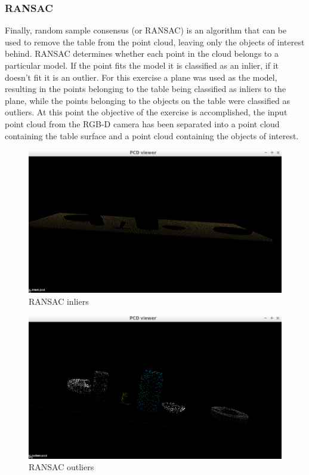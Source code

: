 \documentclass{article}
\begin{document}
\subsubsection{RANSAC}
Finally, random sample consensus (or RANSAC) is an algorithm that can be used to remove the table from the point cloud, leaving only the objects of interest behind. RANSAC determines whether each point in the cloud belongs to a particular model. If the point fits the model it is classified as an inlier, if it doesn't fit it is an outlier. For this exercise a plane was used as the model, resulting in the points belonging to the table being classified as inliers to the plane, while the points belonging to the objects on the table were classified as outliers. At this point the objective of the exercise is accomplished, the input point cloud from the RGB-D camera has been separated into a point cloud containing the table surface and a point cloud containing the objects of interest.

\begin{figure}[H]
    \includegraphics[width=\linewidth]{ex1extractedinliers.png}
    \caption{RANSAC inliers}
    \label{fig:inliers}
\end{figure}

\begin{figure}[H]
    \includegraphics[width=\linewidth]{ex1extractedoutliers.png}
    \caption{RANSAC outliers}
    \label{fig:outliers}
\end{figure}
\end{document}
